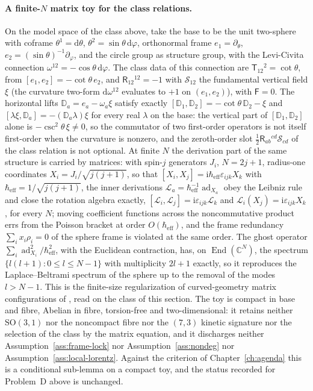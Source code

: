 \paragraph{A finite-\(N\) matrix toy for the class relations.}
On the model space of the class above, take the base to be the unit two-sphere with coframe \(\theta^1=\mathrm d\theta\), \(\theta^2=\sin\theta\,\mathrm d\varphi\), orthonormal frame \(e_1=\partial_\theta\), \(e_2=(\sin\theta)^{-1}\partial_\varphi\), and the circle group as structure group, with the Levi-Civita connection \(\omega^{12}=-\cos\theta\,\mathrm d\varphi\). The class data of this connection are \(\mathsf T_{12}{}^2=\cot\theta\), from \([e_1,e_2]=-\cot\theta\,e_2\), and \(\mathsf R_{12}{}^{12}=-1\) with \(\mathcal S_{12}\) the fundamental vertical field \(\xi\) (the curvature two-form \(\mathrm d\omega^{12}\) evaluates to \(+1\) on \((e_1,e_2)\)), with \(\mathsf F=0\). The horizontal lifts \(\mathbb D_a=e_a-\omega_a\xi\) satisfy exactly \([\mathbb D_1,\mathbb D_2]=-\cot\theta\,\mathbb D_2-\xi\) and \([\lambda\xi,\mathbb D_a]=-(\mathbb D_a\lambda)\xi\) for every real \(\lambda\) on the base: the vertical part of \([\mathbb D_1,\mathbb D_2]\) alone is \(-\csc^2\theta\,\xi\neq0\), so the commutator of two first-order operators is not itself first-order when the curvature is nonzero, and the zeroth-order slot \(\tfrac12\mathsf R_{ab}{}^{cd}\mathcal S_{cd}\) of the class relation is not optional. At finite \(N\) the derivation part of the same structure is carried by matrices: with spin-\(j\) generators \(J_i\), \(N=2j+1\), radius-one coordinates \(X_i=J_i/\sqrt{j(j+1)}\), so that \([X_i,X_j]=\mathrm i\hbar_{\mathrm{eff}}\varepsilon_{ijk}X_k\) with \(\hbar_{\mathrm{eff}}=1/\sqrt{j(j+1)}\), the inner derivations \(\mathcal L_a=\hbar_{\mathrm{eff}}^{-1}\operatorname{ad}_{X_a}\) obey the Leibniz rule and close the rotation algebra exactly, \([\mathcal L_i,\mathcal L_j]=\mathrm i\varepsilon_{ijk}\mathcal L_k\) and \(\mathcal L_i(X_j)=\mathrm i\varepsilon_{ijk}X_k\), for every \(N\); moving coefficient functions across the noncommutative product errs from the Poisson bracket at order \(O(\hbar_{\mathrm{eff}})\), and the frame redundancy \(\sum_i x_i\rho_i=0\) of the sphere frame is violated at the same order. The ghost operator \(\sum_i\operatorname{ad}_{X_i}^2/\hbar_{\mathrm{eff}}^2\), with the Euclidean contraction, has, on \(\operatorname{End}(\mathbb C^N)\), the spectrum \(\{l(l+1):0\le l\le N-1\}\) with multiplicity \(2l+1\) exactly, so it reproduces the Laplace--Beltrami spectrum of the sphere up to the removal of the modes \(l>N-1\). This is the finite-size regularization of curved-geometry matrix configurations of \cite{HattoriSekoTsuchiya2026}, read on the class of this section. The toy is compact in base and fibre, Abelian in fibre, torsion-free and two-dimensional: it retains neither \(\mathrm{SO}(3,1)\) nor the noncompact fibre nor the \((7,3)\) kinetic signature nor the selection of the class by the matrix equation, and it discharges neither Assumption~\ref{ass:frame-lock} nor Assumption~\ref{ass:nondeg} nor Assumption~\ref{ass:local-lorentz}. Against the criterion of Chapter~\ref{ch:agenda} this is a conditional sub-lemma on a compact toy, and the status recorded for Problem~D above is unchanged.

